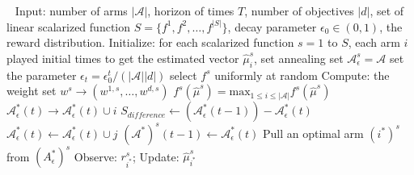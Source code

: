 \begin{algo}
\label{algo:annealing}
\begin{algorithmic}
\STATE	$\ \ $
\STATE	Input: number of arms $|\mathscr{A}|$, horizon of times $T$, number of objectives $|d|$, set of linear scalarized function $S=\{f^1,f^2,\dots,f^{|S|}\}$, decay parameter $\epsilon_0\in(0,1)$, the reward distribution.
\STATE	Initialize: for each scalarized function $s=1$ to $S$, each arm $i$ played initial times to get the estimated vector $\hat{\mu}_i^s$, set annealing set $\mathscr{A}_{\epsilon}^s = \mathscr{A}$
    	\STATE	set the parameter $\epsilon_t = \epsilon_0^t/(|\mathscr{A}||d|)$
        \STATE	select $f^s$ uniformly at random
        \STATE	Compute: the weight set $w^s\rightarrow (w^{1,s},\dots,w^{d,s})$
        \STATE	$f^s(\hat{\mu}^s) = \text{max}_{1\leqslant i \leqslant |\mathscr{A}|} f^s(\hat{\mu}^s)$
            	\STATE	$\mathscr{A}^{\ast}_{\epsilon}(t)\rightarrow \mathscr{A}^{\ast}_{\epsilon}(t) \cup i$
            \ENDIF
        \ENDFOR
        \STATE	$S_{difference} \leftarrow (\mathscr{A}^{\ast}_{\epsilon}(t-1))-\mathscr{A}^{\ast}_{\epsilon}(t)$
            	\STATE	$\mathscr{A}^{\ast}_{\epsilon}(t)\leftarrow \mathscr{A}^{\ast}_{\epsilon}(t) \cup j$
            \ENDIF
        \ENDFOR
        \STATE	$(\mathscr{A}^{\ast})^s(t-1)\leftarrow \mathscr{A}^{\ast}_{\epsilon}(t)$
        \STATE	Pull an optimal arm $(i^{\ast})^s$ from $(A_{\epsilon}^{\ast})^s$
        \STATE	Observe:	$r_{i^{\ast}}^s$;
        \STATE	Update:	$\hat{\mu}_{i^{\ast}}^s$
    \ENDFOR   
\end{algorithmic}
\end{algo}

